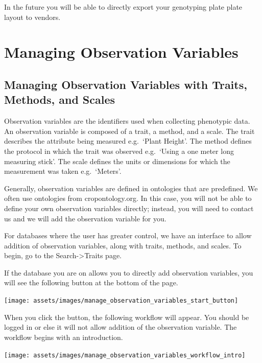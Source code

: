 \documentclass[
  12pt,
]{book}
\begin{document}
In the future you will be able to directly export your genotyping plate plate layout to vendors.

\hypertarget{managing-observation-variables}{%
\chapter{Managing Observation Variables}\label{managing-observation-variables}}

\hypertarget{managing-observation-variables-with-traits-methods-and-scales}{%
\section{Managing Observation Variables with Traits, Methods, and Scales}\label{managing-observation-variables-with-traits-methods-and-scales}}

Observation variables are the identifiers used when collecting phenotypic data. An observation variable is composed of a trait, a method, and a scale. The trait describes the attribute being measured e.g.~`Plant Height'. The method defines the protocol in which the trait was observed e.g.~`Using a one meter long measuring stick'. The scale defines the units or dimensions for which the measurement was taken e.g.~`Meters'.

Generally, observation variables are defined in ontologies that are predefined. We often use ontologies from cropontology.org. In this case, you will not be able to define your own observation variables directly; instead, you will need to contact us and we will add the observation variable for you.

For databases where the user has greater control, we have an interface to allow addition of observation variables, along with traits, methods, and scales. To begin, go to the Search-\textgreater Traits page.

If the database you are on allows you to directly add observation variables, you will see the following button at the bottom of the page.

\begin{center}\texttt{[image: assets/images/manage\_observation\_variables\_start\_button]} \end{center}

When you click the button, the following workflow will appear. You should be logged in or else it will not allow addition of the observation variable. The workflow begins with an introduction.

\begin{center}\texttt{[image: assets/images/manage\_observation\_variables\_workflow\_intro]} \end{center}
\end{document}
